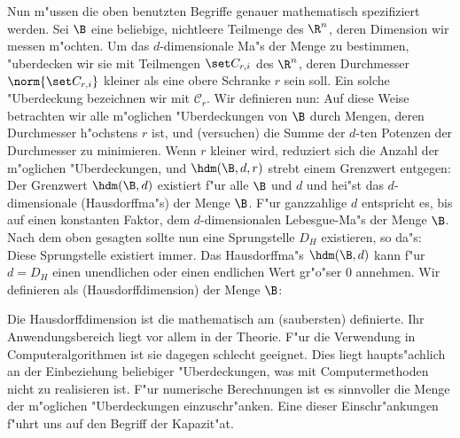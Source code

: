 Nun m"ussen die oben benutzten Begriffe genauer mathematisch spezifiziert werden. 
Sei $\B$ eine beliebige, nichtleere Teilmenge des $\R^n$, deren Dimension wir messen m"ochten. Um das
$d$-dimensionale Ma"s  der Menge zu bestimmen, "uberdecken wir sie mit Teilmengen 
$\set C_{r,i}$ des $\R^n$, deren Durchmesser $\norm{\set C_{r,i}}$ kleiner als eine obere
Schranke $r$ sein soll. Ein solche "Uberdeckung bezeichnen wir mit $\mathcal
C_r$. Wir definieren nun:
Auf diese Weise betrachten wir alle m"oglichen "Uberdeckungen von $\B$ durch Mengen,
deren Durchmesser h"ochstens $r$ ist, und \naja(versuchen) die Summe der $d$-ten Potenzen der
Durchmesser zu minimieren. Wenn $r$ kleiner wird, reduziert sich die Anzahl der
m"oglichen "Uberdeckungen, und $\hdm(\B,d,r)$ strebt einem Grenzwert entgegen:
Der Grenzwert $\hdm(\B,d)$ existiert f"ur alle $\B$ und $d$ und hei"st das
$d$-dimensionale \begriff(Hausdorffma"s) der Menge $\B$. F"ur ganzzahlige $d$ entspricht
es, bis auf einen konstanten Faktor, dem $d$-dimensionalen Lebesgue-Ma"s der Menge
$\B$. Nach dem oben gesagten sollte nun eine Sprungstelle $D_H$ existieren, so
da"s:
Diese Sprungstelle existiert immer\footnotemark. 
Das Hausdorffma"s $\hdm(\B,d)$ kann f"ur
$d=D_H$ einen unendlichen oder einen endlichen Wert gr"o"ser 0 annehmen\footnotemark. Wir definieren als
\begriff(Hausdorffdimension) der Menge $\B$:

Die Hausdorffdimension ist die mathematisch am \naja(saubersten) definierte. Ihr
Anwendungsbereich liegt vor allem in der Theorie. F"ur die Verwendung in
Computeralgorithmen ist sie dagegen schlecht geeignet. Dies liegt haupts"achlich an
der Einbeziehung beliebiger "Uberdeckungen, was mit Computermethoden nicht zu realisieren
ist. F"ur numerische Berechnungen ist es sinnvoller die Menge der m"oglichen
"Uberdeckungen einzuschr"anken. Eine dieser Einschr"ankungen f"uhrt uns auf den Begriff
der Kapazit"at.



